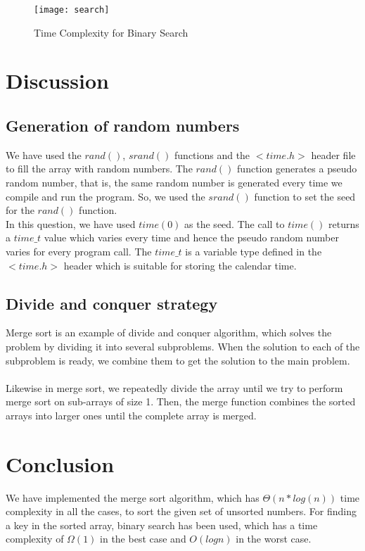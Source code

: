 \documentclass[letterpaper, 11 pt, conference]{ieeeconf}  %
\begin{document}
\begin{figure}
\texttt{[image: search]}
\caption{Time Complexity for Binary Search}
\end{figure}

\section{Discussion}
\subsection{Generation of random numbers}
We have used the  $rand()$, $srand()$ functions and the $<time.h>$ header file to fill the array with random numbers. The $rand()$ function generates a pseudo random number, that is, the same random number is generated every time we compile and run the program. 
So, we used the $srand()$ function to set the seed for the $rand()$ function.\\

In this question, we have used  $time(0)$ as the seed. The call to $time()$ returns a $time\_t$ value which varies every time and hence the pseudo random number varies for every program call. The $time\_t$ is a variable type defined in the $<time.h>$ header which is suitable for storing the calendar time.

\subsection{Divide and conquer strategy}
Merge sort is an example of divide and conquer algorithm, which solves the problem by dividing it into several subproblems. When the solution to each of the subproblem is ready, we combine them to get the solution to the main problem.\\ \\
Likewise in merge sort, we repeatedly divide the array until we try to perform merge sort on sub-arrays of size 1. Then, the merge function combines the sorted arrays into larger ones until the complete array is merged.

\section{Conclusion}
We have implemented the merge sort algorithm, which has $\Theta(n*log(n))$ time complexity in all the cases, to sort the given set of unsorted numbers. For finding a key in the sorted array, binary search has been used, which has a time complexity of $\Omega(1)$ in the best case and $O(log n)$ in the worst case.
\end{document}
